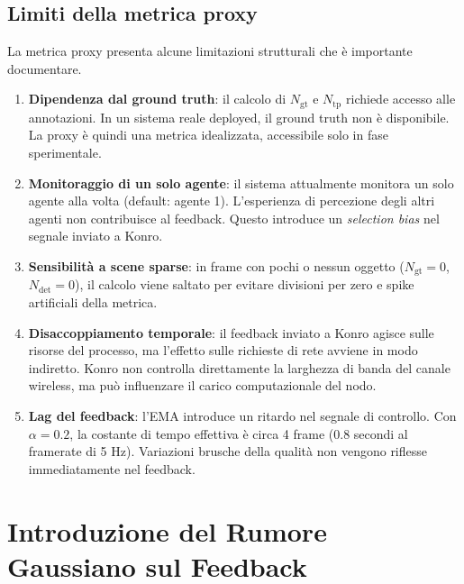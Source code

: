 \documentclass[12pt,a4paper]{article}
\begin{document}
\subsection{Limiti della metrica proxy}

La metrica proxy presenta alcune limitazioni strutturali che \`e importante documentare.

\begin{enumerate}
  \item \textbf{Dipendenza dal ground truth}: il calcolo di $N_\text{gt}$ e $N_\text{tp}$
        richiede accesso alle annotazioni. In un sistema reale deployed, il ground truth
        non \`e disponibile. La proxy \`e quindi una metrica idealizzata, accessibile solo
        in fase sperimentale.

  \item \textbf{Monitoraggio di un solo agente}: il sistema attualmente monitora un solo
        agente alla volta (default: agente 1). L'esperienza di percezione degli altri
        agenti non contribuisce al feedback. Questo introduce un \textit{selection bias}
        nel segnale inviato a Konro.

  \item \textbf{Sensibilit\`a a scene sparse}: in frame con pochi o nessun oggetto
        ($N_\text{gt} = 0$, $N_\text{det} = 0$), il calcolo viene saltato per evitare
        divisioni per zero e spike artificiali della metrica.

  \item \textbf{Disaccoppiamento temporale}: il feedback inviato a Konro agisce sulle
        risorse del processo, ma l'effetto sulle richieste di rete avviene in modo
        indiretto. Konro non controlla direttamente la larghezza di banda del canale
        wireless, ma pu\`o influenzare il carico computazionale del nodo.

  \item \textbf{Lag del feedback}: l'EMA introduce un ritardo nel segnale di controllo.
        Con $\alpha = 0.2$, la costante di tempo effettiva \`e circa 4 frame (0.8 secondi
        al framerate di 5 Hz). Variazioni brusche della qualit\`a non vengono riflesse
        immediatamente nel feedback.
\end{enumerate}

\section{Introduzione del Rumore Gaussiano sul Feedback}
\end{document}
